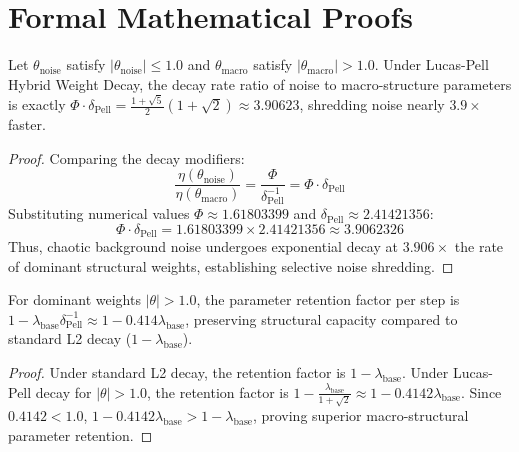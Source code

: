 \section{Formal Mathematical Proofs}

\begin{theorem}
Let $\theta_{\text{noise}}$ satisfy $|\theta_{\text{noise}}| \le 1.0$ and $\theta_{\text{macro}}$ satisfy $|\theta_{\text{macro}}| > 1.0$. Under Lucas-Pell Hybrid Weight Decay, the decay rate ratio of noise to macro-structure parameters is exactly $\Phi \cdot \delta_{\text{Pell}} = \frac{1+\sqrt{5}}{2}(1+\sqrt{2}) \approx 3.90623$, shredding noise nearly $3.9\times$ faster.
\end{theorem}

\begin{proof}
Comparing the decay modifiers:
\begin{equation}
    \frac{\eta(\theta_{\text{noise}})}{\eta(\theta_{\text{macro}})} = \frac{\Phi}{\delta_{\text{Pell}}^{-1}} = \Phi \cdot \delta_{\text{Pell}}
\end{equation}
Substituting numerical values $\Phi \approx 1.61803399$ and $\delta_{\text{Pell}} \approx 2.41421356$:
\begin{equation}
    \Phi \cdot \delta_{\text{Pell}} = 1.61803399 \times 2.41421356 \approx 3.9062326
\end{equation}
Thus, chaotic background noise undergoes exponential decay at $3.906\times$ the rate of dominant structural weights, establishing selective noise shredding.
\end{proof}

\begin{theorem}
For dominant weights $|\theta| > 1.0$, the parameter retention factor per step is $1 - \lambda_{\text{base}} \delta_{\text{Pell}}^{-1} \approx 1 - 0.414 \lambda_{\text{base}}$, preserving structural capacity compared to standard L2 decay ($1 - \lambda_{\text{base}}$).
\end{theorem}

\begin{proof}
Under standard L2 decay, the retention factor is $1 - \lambda_{\text{base}}$. Under Lucas-Pell decay for $|\theta| > 1.0$, the retention factor is $1 - \frac{\lambda_{\text{base}}}{1+\sqrt{2}} \approx 1 - 0.4142 \lambda_{\text{base}}$.
Since $0.4142 < 1.0$, $1 - 0.4142 \lambda_{\text{base}} > 1 - \lambda_{\text{base}}$, proving superior macro-structural parameter retention.
\end{proof}
